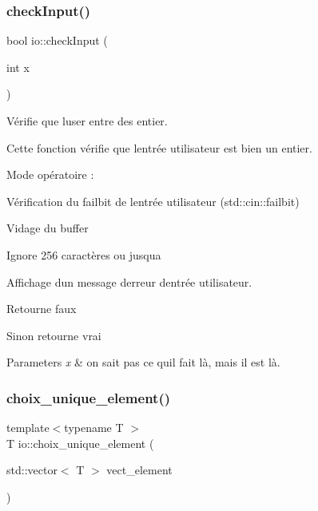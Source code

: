 \subsubsection{\texorpdfstring{check\+Input()}{checkInput()}}
{\footnotesize\ttfamily bool io\+::check\+Input (\begin{DoxyParamCaption}\item[{int}]{x }\end{DoxyParamCaption})}



Vérifie que l\textquotesingle{}user entre des entier. 

Cette fonction vérifie que l\textquotesingle{}entrée utilisateur est bien un entier.

Mode opératoire \+:
\begin{DoxyItemize}
\item Vérification du failbit de l\textquotesingle{}entrée utilisateur (std\+::cin\+::failbit)
\begin{DoxyEnumerate}
\item Vidage du buffer
\item Ignore 256 caractères ou jusqu\textquotesingle{}a {\ttfamily ~\newline
}
\item Affichage d\textquotesingle{}un message d\textquotesingle{}erreur d\textquotesingle{}entrée utilisateur.
\item Retourne faux
\end{DoxyEnumerate}
\item Sinon retourne vrai 
\begin{DoxyParams}{Parameters}
{\em x} & on sait pas ce qu\textquotesingle{}il fait là, mais il est là. \\
\hline
\end{DoxyParams}

\end{DoxyItemize}\mbox{\label{namespaceio_a379c013a79ad2d343811725631472b20}} 
\subsubsection{\texorpdfstring{choix\+\_\+unique\+\_\+element()}{choix\_unique\_element()}}
{\footnotesize\ttfamily template$<$typename T $>$ \\
T io\+::choix\+\_\+unique\+\_\+element (\begin{DoxyParamCaption}\item[{std\+::vector$<$ T $>$}]{vect\+\_\+element }\end{DoxyParamCaption})}



